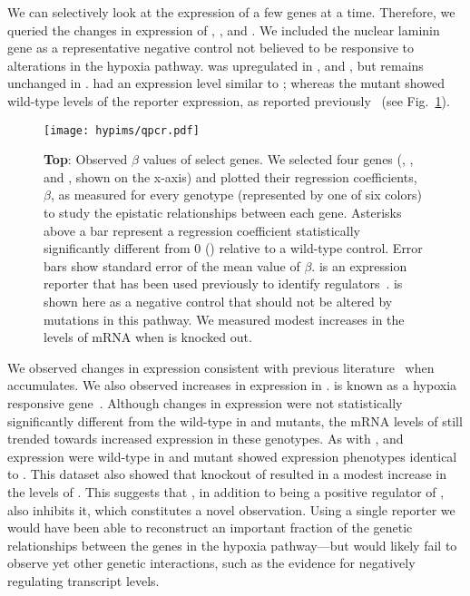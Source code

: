 We can
selectively look at the expression of a few genes at a time. Therefore, we
queried the changes in expression of , , and \nhr{}. We
included the nuclear laminin gene \lam{} as a representative negative control not
believed to be responsive to alterations in the hypoxia pathway.
\nhr{} was upregulated in \egl{}, \rhy{} and \vhl{}, but remains unchanged in \hif{}.
\eglvhl{} had an expression level similar to \egl{}; whereas the
\eglhif{} mutant showed wild-type levels of the reporter expression, as reported
previously~\citep{Shen2006} (see Fig.~\ref{fig:qpcr}).

\begin{figure}[tbhp]
\centering
\texttt{[image: hypims/qpcr.pdf]}
\caption{
\textbf{Top}: Observed $\beta$ values of select genes. We selected
four genes (, , \nhr{} and \lam{}, shown on the x-axis)
and plotted their regression coefficients, $\beta$, as measured for every
genotype (represented by one of six colors) to study the epistatic relationships
between each gene. Asterisks above a bar represent a regression coefficient
statistically significantly different from 0 () relative to a wild-type
control. Error bars show standard error of the mean
value of $\beta$. \nhr{} is an expression reporter that has been used previously
to identify  regulators~\citep{Shen2006,Shao2009}. \lam{} is shown here
as a negative control that should not be altered by mutations in this pathway.
We measured modest increases in the levels of  mRNA when \hif{} is
knocked out.
}
\label{fig:qpcr}
\end{figure}

We observed changes in \rhy{} expression consistent with previous
literature~\citep{Shen2006} when \hifp{} accumulates.
We also observed increases in  expression in \egl{}.
 is known as a hypoxia responsive gene~\citep{Powell-Coffman2010}.
Although changes in  expression were not statistically significantly
different from the wild-type in
\rhy{} and \vhl{} mutants, the mRNA levels of  still trended towards
increased expression in these genotypes.
As with \nhr{},  and  expression were wild-type in
\eglhif{} and \eglvhl{} mutant showed expression phenotypes identical to \egl{}.
This dataset also showed that knockout of  resulted in a modest
increase in the levels of . This suggests that , in
addition to being a positive regulator of , also inhibits it, which
constitutes a novel observation.
Using a single reporter we would have been able to reconstruct an
important fraction of the genetic relationships between the genes in the hypoxia
pathway–--but would likely fail to observe yet other genetic interactions, such as
the evidence for  negatively regulating  transcript levels.


